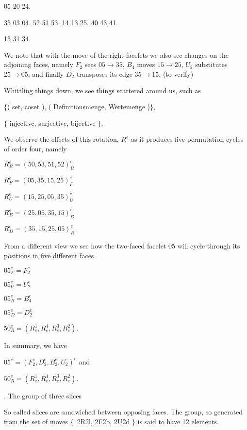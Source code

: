 {{\smallskip
{} 05 20 24.\par\thinspace
{} 35 03 04.\qquad{} 52 51 53.\qquad
{} 14 13 25.\qquad{} 40 43 41.\par\thinspace
{} 15 31 34.

\smallskip
We note that with the move of the right facelets we
also see changes on the adjoining faces, namely
$F_2$ sees $05\to 35$, $B_4$ moves $15\to 25$,
$U_2$ substitutes $25\to 05$, and finally $D_2$
transposes its edge $35\to 15$. (to verify)

\smallskip
Whittling things down, we see things scattered around us,
such as

\e$\{$( set, coset ), ( Definitionsmenge, Wertemenge )$\}$,

$\{$ injective, surjective, bijective $\}$.

\vfil\eject
We observe the effects of this rotation, $R^e$ as it
produces five permutation cycles of order four, namely

\smallskip
$R_R^e=(50, 53, 51, 52)_R^e$

$R_F^e=(05, 35, 15, 25)_F^e$

$R_U^e=(15, 25, 05, 35)_U^e$

$R_B^e=(25, 05, 35, 15)_B^e$

$R_D^e=(35, 15, 25, 05)_R^e$

\e
From a different view we see how the two-faced facelet $05$
will cycle through its positions in five
different faces.

\smallskip$05_F^e=F_2^e$

$05_U^e=U_2^e$

$05_B^e=B_4^e$

$05_D^e=D_2^e$

$50_R^e=(R_e^1, R_e^4, R_e^3, R_e^2)$.


\e In summary, we have

$05^e=(F_2^e, D_2^e, B_2^e, U_2^e)^e$ and

$50_R^e=(R_e^1, R_e^4, R_e^3, R_e^2)$.
}%
\hfil\eject
{}. The group of three slices

So called slices are sandwiched between opposing faces.
The group, so generated from the set of moves\break
$\{$~2R2l, 2F2b, 2U2d $\}$
is said to have 12 elements\gg.

}
